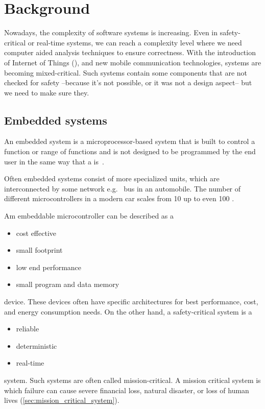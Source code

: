 
\chapter{Background}
\label{ch:background}

Nowadays, the complexity of software systems is increasing. Even in safety-critical or real-time systems, we can reach a complexity level where we need computer aided analysis techniques to ensure correctness. With the introduction of Internet of Things (\iot), and new mobile communication technologies, systems are becoming mixed-critical. Such systems contain some components that are not checked for safety --because it's not possible, or it was not a design aspect-- but we need to make sure they.

\section{Embedded systems}

An embedded system is a microprocessor-based system that is built to control a function or range of functions and is not designed to be programmed by the end user in the same way that a  is~\cite{heath2002embedded}.

Often embedded systems consist of more specialized units, which are interconnected by some network e.g.\  bus in an automobile. The number of different microcontrollers in a modern car scales from 10 up to even 100 \citep{VEHICLE_DYN}.

Am embeddable microcontroller can be described as a
\begin{itemize}
	\item cost effective
	\item small footprint
	\item low end performance
	\item small program and data memory
\end{itemize}
device. These devices often have specific architectures for best performance, cost, and energy consumption needs.
\needspace{5em}
\noindent On the other hand, a safety-critical system is a
\begin{itemize}
	\item reliable
	\item deterministic
	\item real-time
\end{itemize}
system. Such systems are often called mission-critical. A mission critical system is which failure can cause severe financial loss, natural disaster, or loss of human lives (\cref{sec:mission_critical_system}).

